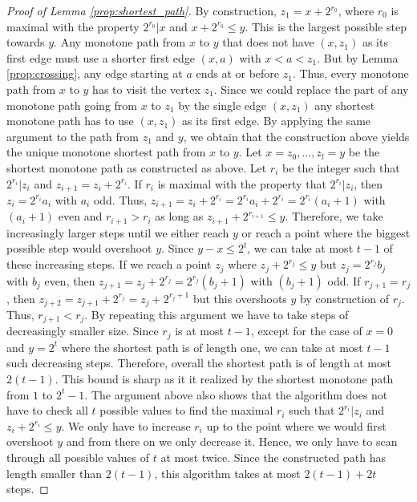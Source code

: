 \documentclass[11pt]{article}
\begin{document}
%
\begin{proof}[Proof of Lemma \ref{prop:shortest_path}]
By construction, $z_1=x+2^{r_0}$, where $r_0$ is maximal with the property $2^{r_0}\vert x$ and $x+2^{r_0}\leq y$. This is the largest possible step towards $y$. Any monotone path from $x$ to $y$ that does not have $(x,z_1)$ as its first edge must use a shorter first edge $(x,a)$ with $x<a<z_1$. But by Lemma \ref{prop:crossing}, any edge starting at $a$ ends at or before $z_1$. Thus, every monotone path from $x$ to $y$ has to visit the vertex $z_1$. Since we could replace the part of any monotone path going from $x$ to $z_1$ by the single edge $(x,z_1)$ any shortest monotone path has to use $(x,z_1)$ as its first edge. By applying the same argument to the path from $z_1$ and $y$, we obtain that the construction above yields the unique monotone shortest path from $x$ to $y$.   
%
Let $x=z_0,\ldots,z_l=y$ be the shortest monotone path as constructed as above. Let $r_i$ be the integer such that $2^{r_i}\vert z_i$ and $z_{i+1}=z_i+2^{r_i}$. If $r_i$ is maximal with the property that $2^{r_i}\vert z_i$, then $z_i=2^{r_i}a_i$ with $a_i$ odd. Thus, $z_{i+1}=z_i+2^{r_i}=2^{r_i}a_i+2^{r_i}=2^{r_i}(a_i+1)$ with $(a_i+1)$ even and $r_{i+1}>r_i$ as long as $z_{i+1}+2^{r_{i+1}}\leq y$. Therefore, we take increasingly larger steps until we either reach $y$ or reach a point where the biggest possible step would overshoot $y$. Since $y-x\leq 2^t$, we can take at most $t-1$ of these increasing steps. If we reach a point $z_j$ where $z_j+2^{r_{j}}\leq y$ but $z_j=2^{r_j}b_j$ with $b_j$ even, then $z_{j+1}=z_j+2^{r_j}=2^{r_j}(b_j+1)$ with $(b_j+1)$ odd. If $r_{j+1}=r_j$, then $z_{j+2}=z_{j+1}+2^{r_j}=z_j+2^{r_j+1}$ but this overshoots $y$ by construction of $r_j$. Thus, $r_{j+1}<r_{j}$. By repeating this argument we have to take steps of decreasingly smaller size. Since $r_j$ is at most $t-1$, except for the case of $x=0$ and $y=2^t$ where the shortest path is of length one, we can take at most $t-1$ such decreasing steps. Therefore, overall the shortest path is of length at most $2(t-1)$. This bound is sharp as it it realized by the shortest monotone path from $1$ to $2^{t}-1$. 
%
The argument above also shows that the algorithm does not have to check all $t$ possible values to find the maximal $r_i$ such that $2^{r_i}\vert z_i$ and $z_i+2^{r_i}\leq y$. We only have to increase $r_i$ up to the point where we would first overshoot $y$ and from there on we only decrease it. Hence, we only have to scan through all possible values of $t$ at most twice. Since the constructed path has length smaller than $2(t-1)$, this algorithm takes at most $2(t-1)+2t$ steps.   
\end{proof}
%
%
\end{document}
